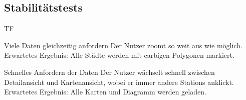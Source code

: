 \subsection{Stabilitätstests}
\begin{Kriterien}{TF}

	\item[Viele Daten gleichzeitig anfordern] Der Nutzer zoomt so weit aus wie möglich.\\ Erwartetes Ergebnis: Alle Städte werden mit carbigen Polygonen markiert.

	\item[Schnelles Anfordern der Daten] Der Nutzer wächselt schnell zwischen Detailansicht und Kartenansicht, wobei er immer andere \glspl{Station} anklickt. \\ Erwartetes Ergebnis: Alle Karten und Diagramm werden geladen.

\end{Kriterien}
